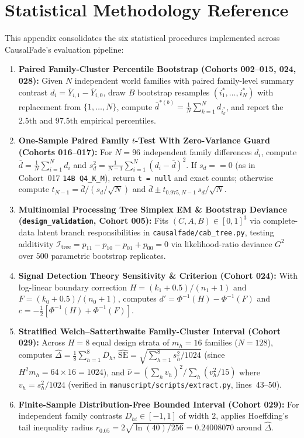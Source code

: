 \chapter{Statistical Methodology Reference}\label{app:stats_reference}
This appendix consolidates the six statistical procedures implemented across CausalFade's evaluation pipeline:
\begin{enumerate}
  \item \textbf{Paired Family-Cluster Percentile Bootstrap (Cohorts 002--015, 024, 028):} Given $N$ independent world families with paired family-level summary contrast $d_i = \bar{Y}_{i,1} - \bar{Y}_{i,0}$, draw $B$ bootstrap resamples $(i_1^*,\dots,i_N^*)$ with replacement from $\{1,\dots,N\}$, compute $\bar{d}^{*(b)} = \frac{1}{N}\sum_{k=1}^N d_{i_k^*}$, and report the $2.5\text{th}$ and $97.5\text{th}$ empirical percentiles.
  \item \textbf{One-Sample Paired Family $t$-Test With Zero-Variance Guard (Cohorts 016--017):} For $N=96$ independent family differences $d_i$, compute $\bar{d} = \frac{1}{N}\sum_{i=1}^N d_i$ and $s_d^2 = \frac{1}{N-1}\sum_{i=1}^N (d_i - \bar{d})^2$. If $s_d == 0$ (as in Cohort~017 \texttt{14B Q4\_K\_M}), return \texttt{t = null} and exact counts; otherwise compute $t_{N-1} = \bar{d}/(s_d/\sqrt{N})$ and $\bar{d} \pm t_{0.975, N-1}\,s_d/\sqrt{N}$.
  \item \textbf{Multinomial Processing Tree Simplex EM \& Bootstrap Deviance (\texttt{design\_validation}, Cohort 005):} Fits $(C,A,B) \in [0,1]^3$ via complete-data latent branch responsibilities in \texttt{causalfade/cab\_tree.py}, testing additivity $\mathcal{I}_{\mathrm{tree}} = p_{11}-p_{10}-p_{01}+p_{00}=0$ via likelihood-ratio deviance $G^2$ over $500$ parametric bootstrap replicates.
  \item \textbf{Signal Detection Theory Sensitivity \& Criterion (Cohort 024):} With log-linear boundary correction $H = (k_1 + 0.5)/(n_1 + 1)$ and $F = (k_0 + 0.5)/(n_0 + 1)$, computes $d' = \Phi^{-1}(H) - \Phi^{-1}(F)$ and $c = -\frac{1}{2}[\Phi^{-1}(H) + \Phi^{-1}(F)]$.
  \item \textbf{Stratified Welch--Satterthwaite Family-Cluster Interval (Cohort 029):} Across $H=8$ equal design strata of $m_h=16$ families ($N=128$), computes $\widehat{\Delta} = \frac{1}{8}\sum_{h=1}^8 \bar{D}_h$, $\widehat{\mathrm{SE}} = \sqrt{\sum_{h=1}^8 s_h^2 / 1024}$ (since $H^2 m_h = 64 \times 16 = 1024$), and $\hat{\nu} = (\sum_h v_h)^2 / \sum_h (v_h^2 / 15)$ where $v_h = s_h^2 / 1024$ (verified in \texttt{manuscript/scripts/extract.py}, lines~43--50).
  \item \textbf{Finite-Sample Distribution-Free Bounded Interval (Cohort 029):} For independent family contrasts $D_{hi} \in [-1, 1]$ of width $2$, applies Hoeffding's tail inequality radius $r_{0.05} = 2\sqrt{\ln(40)/256} = 0.24008070$ around $\widehat{\Delta}$.
\end{enumerate}

